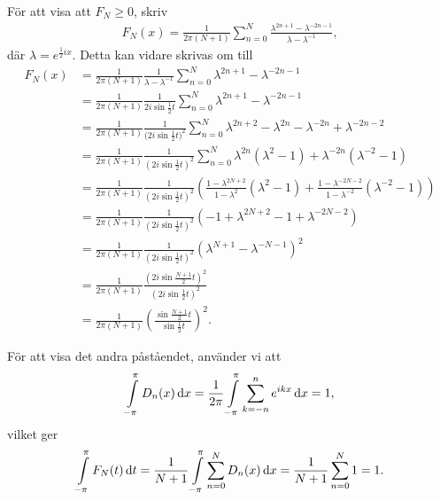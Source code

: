 För att visa att $F_{N} \geq 0$, skriv
\begin{align*}
	F_{N}(x) = \frac{1}{2\pi(N + 1)}\sum\limits_{n = 0}^{N}\frac{\lambda^{2n + 1} - \lambda^{-2n - 1}}{\lambda - \lambda^{-1}},
\end{align*}
där $\lambda = e^{\frac{1}{2}ix}$. Detta kan vidare skrivas om till
\begin{align*}
	F_{N}(x) &= \frac{1}{2\pi(N + 1)}\frac{1}{\lambda - \lambda^{-1}}\sum\limits_{n = 0}^{N}\lambda^{2n + 1} - \lambda^{-2n - 1} \\
	         &= \frac{1}{2\pi(N + 1)}\frac{1}{2i\sin{\frac{1}{2}t}}\sum\limits_{n = 0}^{N}\lambda^{2n + 1} - \lambda^{-2n - 1} \\
	         &= \frac{1}{2\pi(N + 1)}\frac{1}{(2i\sin{\frac{1}{2}t)^{2}}}\sum\limits_{n = 0}^{N}\lambda^{2n + 2} - \lambda^{2n} - \lambda^{-2n} + \lambda^{-2n - 2} \\
	         &= \frac{1}{2\pi(N + 1)}\frac{1}{(2i\sin{\frac{1}{2}t})^{2}}\sum\limits_{n = 0}^{N}\lambda^{2n}(\lambda^{2} - 1) + \lambda^{-2n}(\lambda^{-2} - 1) \\
	         &= \frac{1}{2\pi(N + 1)}\frac{1}{(2i\sin{\frac{1}{2}t})^{2}}\left(\frac{1 - \lambda^{2N + 2}}{1 - \lambda^{2}}(\lambda^{2} - 1) + \frac{1 - \lambda^{-2N - 2}}{1 - \lambda^{-2}}(\lambda^{-2} - 1)\right) \\
	         &= \frac{1}{2\pi(N + 1)}\frac{1}{(2i\sin{\frac{1}{2}t})^{2}}\left(- 1 + \lambda^{2N + 2} - 1 + \lambda^{-2N - 2}\right) \\
	         &= \frac{1}{2\pi(N + 1)}\frac{1}{(2i\sin{\frac{1}{2}t})^{2}}(\lambda^{N + 1} - \lambda^{-N - 1})^{2} \\
	         &= \frac{1}{2\pi(N + 1)}\frac{(2i\sin{\frac{N + 1}{2}t})^{2}}{(2i\sin{\frac{1}{2}t})^{2}} \\
	         &= \frac{1}{2\pi(N + 1)}\left(\frac{\sin{\frac{N + 1}{2}t}}{\sin{\frac{1}{2}t}}\right)^{2}.
\end{align*}

För att visa det andra påståendet, använder vi att
\begin{align*}
	\int\limits_{-\pi}^{\pi}D_{n}(x)\dd{x} = \frac{1}{2\pi}\int\limits_{-\pi}^{\pi}\sum\limits_{k = -n}^{n}e^{ikx}\dd{x} = 1,
\end{align*}
vilket ger
\begin{align*}
	\int\limits_{-\pi}^{\pi}F_{N}(t)\dd{t} = \frac{1}{N + 1}\int\limits_{-\pi}^{\pi}\sum\limits_{n = 0}^{N}D_{n}(x)\dd{x} = \frac{1}{N + 1}\sum\limits_{n = 0}^{N}1 = 1.
\end{align*}

